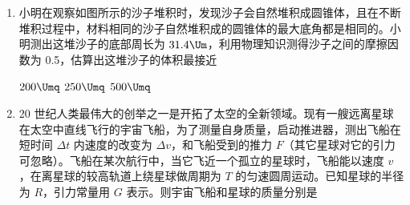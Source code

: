 \documentclass[\gkver]{gaokaozhenti}
\begin{document}
\begin{enumerate}

{上板为负极，电流 $I = \frac{Bvad^{2}}{Rab + \rho d}$}
{下板为正极，电流 $I = \frac{Bdvab}{Rab + \rho d}$}
{下板为负极，电流 $I = \frac{Bvad^{2}}{Rab + \rho d}$}

\item
小明在观察如图所示的沙子堆积时，发现沙子会自然堆积成圆锥体，且在不断堆积过程中，材料相同的沙子自然堆积成的圆锥体的最大底角都是相同的。小明测出这堆沙子的底部周长为 $31.4\Um$，利用物理知识测得沙子之间的摩擦因数为 0.5，估算出这堆沙子的体积最接近


\fourchoices[answer=A]
{$60\Umq$}
{$200\Umq$}
{$250\Umq$}
{$500\Umq$}

\item
20 世纪人类最伟大的创举之一是开拓了太空的全新领域。现有一艘远离星球在太空中直线飞行的宇宙飞船，为了测量自身质量，启动推进器，测出飞船在短时间 $\Delta t$ 内速度的改变为 $\Delta v$，和飞船受到的推力 $F$（其它星球对它的引力可忽略）。飞船在某次航行中，当它飞近一个孤立的星球时，飞船能以速度 $v$，在离星球的较高轨道上绕星球做周期为 $T$ 的匀速圆周运动。已知星球的半径为 $R$，引力常量用 $G$ 表示。则宇宙飞船和星球的质量分别是


\end{enumerate}
\end{document}
